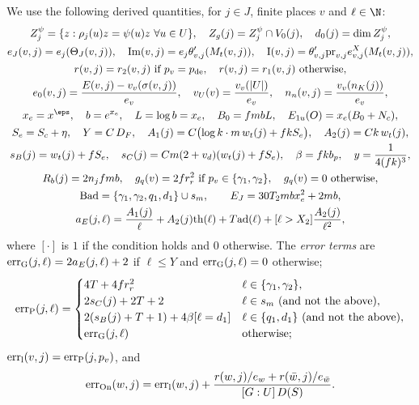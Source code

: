 We use the following derived quantities, for $j\in J$, finite places $v$ and $\ell\in\N$:
\begin{gather*}
Z_j^\psi=\{z:\rho_j(u)z=\psi(u)z\ \forall u\in U\},\quad Z_g(j)=Z_j^\psi\cap V_0(j),\quad d_0(j)=\dim Z_j^\psi,\\
e_J(v,j)=e_j(\Theta_J(v,j)),\quad \mathrm{Im}(v,j)=e_j\theta'_{v,j}(M_t(v,j)),\quad
\mathrm{I}(v,j)=\theta'_{v,j}\mathrm{pr}_{v,j}e^X_{v,j}(M_t(v,j)),\\
r(v,j)=r_2(v,j)\ \text{if }p_v=p_{\mathrm{de}},\quad r(v,j)=r_1(v,j)\ \text{otherwise},\\
e_0(v,j)=\frac{E(v,j)-v_v(\sigma(v,j))}{e_v},\quad v_U(v)=\frac{v_v(|U|)}{e_v},\quad
n_n(v,j)=\frac{v_v(n_K(j))}{e_v},\\
x_e=x^{\eps},\quad b=e^{x_e},\quad L=\log b=x_e,\quad B_0=fmbL,\quad E_{1u}(O)=x_e(B_0+N_c),\\
S_e=S_c+\eta,\quad Y=C\,D_F,\quad A_1(j)=C\bigl(\log k\cdot m\,w_t(j)+fkS_e\bigr),\quad A_2(j)=Ck\,w_t(j),\\
s_B(j)=w_t(j)+fS_e,\quad s_C(j)=Cm(2+v_d)(w_t(j)+fS_e),\quad \beta=fkb_p,\quad y=\frac{1}{4(fk)^3},\\
R_b(j)=2n_jfmb,\quad g_q(v)=2fr_r^2\ \text{if }p_v\in\{\gamma_1,\gamma_2\},\quad g_q(v)=0\ \text{otherwise},\\
\mathrm{Bad}=\{\gamma_1,\gamma_2,q_1,d_1\}\cup s_m,\qquad E_J=30T_2mbx_e^2+2mb,\\
a_E(j,\ell)=\frac{A_1(j)}{\ell}+A_2(j)\mathrm{th}(\ell)+T\mathrm{ad}(\ell)+[\ell>X_2]\frac{A_2(j)}{\ell^2},
\end{gather*}
where $[\cdot]$ is $1$ if the condition holds and $0$ otherwise. The \emph{error terms} are
$\mathrm{err}_{\mathrm{G}}(j,\ell)=2a_E(j,\ell)+2$ if $\ell\le Y$ and $\mathrm{err}_{\mathrm{G}}(j,\ell)=0$ otherwise;
\begin{equation}\label{eq:pf:onto3:errP}
\mathrm{err}_{\mathrm{P}}(j,\ell)=\begin{cases}
4T+4fr_r^2 & \ell\in\{\gamma_1,\gamma_2\},\\
2s_C(j)+2T+2 & \ell\in s_m\text{ (and not the above)},\\
2(s_B(j)+T+1)+4\beta[\ell=d_1] & \ell\in\{q_1,d_1\}\text{ (and not the above)},\\
\mathrm{err}_{\mathrm{G}}(j,\ell) & \text{otherwise};
\end{cases}
\end{equation}
$\mathrm{err}_{\mathrm{l}}(v,j)=\mathrm{err}_{\mathrm{P}}(j,p_v)$, and
\begin{equation}\label{eq:pf:onto3:errOn}
\mathrm{err}_{\mathrm{On}}(w,j)=\mathrm{err}_{\mathrm{l}}(w,j)+\frac{r(w,j)/e_w+r(\bar w,j)/e_{\bar w}}{[G:U]\,D(S)} .
\end{equation}

